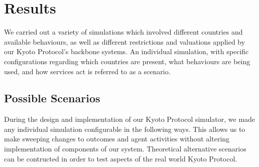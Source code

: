 \section{Results}

We carried out a variety of simulations which involved different countries and available behaviours, as well as different restrictions and valuations applied by our Kyoto Protocol's backbone systems. An individual simulation, with specific configurations regarding which countries are present, what behaviours are being used, and how services act is referred to as a scenario.

\subsection{Possible Scenarios}

During the design and implementation of our Kyoto Protocol simulator, we made any individual simulation configurable in the following ways. This allows us to make sweeping changes to outcomes and agent activities without altering implementation of components of our system. Theoretical alternative scenarios can be contructed in order to test aspects of the real world Kyoto Protocol.

